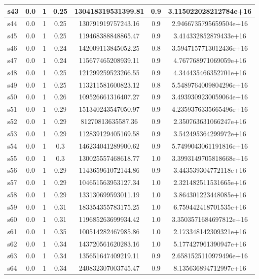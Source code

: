 \documentclass{article}
\begin{document}
\begin{tabular}{|l|c|c|c|c|c|c|}
\hline
s43 &0.0 & 1 & 0.25 & 130418319531399.81 & 0.9 & 3.115022028212784e+16\\
\hline
s44 &0.0 & 1 & 0.25 & 130791919757243.16 & 0.9 & 2.9466735795659504e+16\\
\hline
s45 &0.0 & 1 & 0.25 & 119468388848865.47 & 0.9 & 3.414332852879433e+16\\
\hline
s46 &0.0 & 1 & 0.24 & 142009113845052.25 & 0.8 & 3.5947157713012436e+16\\
\hline
s47 &0.0 & 1 & 0.24 & 115677465208939.11 & 0.9 & 4.767768971069059e+16\\
\hline
s48 &0.0 & 1 & 0.25 & 121299259523266.55 & 0.9 & 4.344435466352701e+16\\
\hline
s49 &0.0 & 1 & 0.25 & 113211581600823.12 & 0.8 & 5.5489764009804296e+16\\
\hline
s50 &0.0 & 1 & 0.26 & 109526661316407.27 & 0.9 & 3.4939309230059064e+16\\
\hline
s51 &0.0 & 1 & 0.29 & 151340243547050.97 & 0.9 & 4.2359376335665496e+16\\
\hline
s52 &0.0 & 1 & 0.29 & 81270813635587.36 & 0.9 & 2.350763631066247e+16\\
\hline
s53 &0.0 & 1 & 0.29 & 112839129405169.58 & 0.9 & 3.542495364299972e+16\\
\hline
s54 &0.0 & 1 & 0.3 & 146234041289900.62 & 0.9 & 5.7499043061191816e+16\\
\hline
s55 &0.0 & 1 & 0.3 & 130025557468618.77 & 1.0 & 3.3993149705818668e+16\\
\hline
s56 &0.0 & 1 & 0.29 & 114365961072144.86 & 0.9 & 3.443539304772118e+16\\
\hline
s57 &0.0 & 1 & 0.29 & 104651563953127.34 & 1.0 & 2.321482511531665e+16\\
\hline
s58 &0.0 & 1 & 0.29 & 133130699593011.19 & 1.0 & 3.864301223448085e+16\\
\hline
s59 &0.0 & 1 & 0.31 & 183354355783175.25 & 1.0 & 6.759442418701535e+16\\
\hline
s60 &0.0 & 1 & 0.31 & 119685263699934.42 & 1.0 & 3.3503571684697812e+16\\
\hline
s61 &0.0 & 1 & 0.35 & 100514282467985.86 & 1.0 & 2.173348142309321e+16\\
\hline
s62 &0.0 & 1 & 0.34 & 143720561620283.16 & 1.0 & 5.177427961390947e+16\\
\hline
s63 &0.0 & 1 & 0.34 & 135651647409219.11 & 0.9 & 2.6581525110979496e+16\\
\hline
s64 &0.0 & 1 & 0.34 & 240832307003745.47 & 0.9 & 8.135636894712997e+16\\

\end{tabular}
\end{document}
